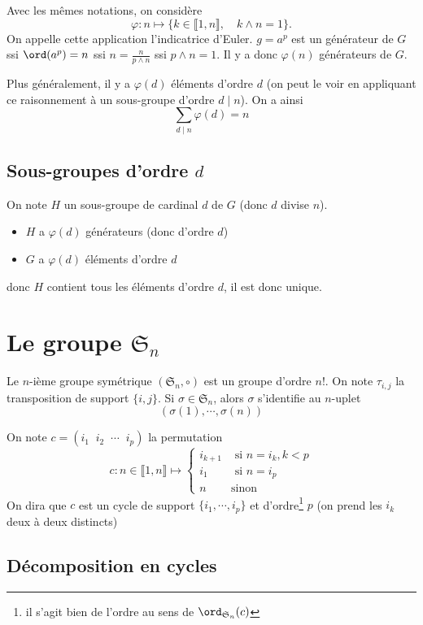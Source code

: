 Avec les mêmes notations, on considère \[
    \varphi: n\longmapsto \{k\in\llbracket 1, n\rrbracket, \quad k\land n=1\}.
\]
On appelle cette application l'indicatrice d'Euler.
$g=a^p$ est un générateur de $G$ ssi $\ord(a^p)=n$ ssi $n=\frac{n}{p\land n}$ ssi $p\land n=1$. Il y a donc $\varphi(n)$ générateurs de $G$.

Plus généralement, il y a $\varphi(d)$ éléments d'ordre $d$ (on peut le voir en appliquant ce raisonnement à un sous-groupe d'ordre $d\;|\; n$). On a ainsi \[
    \sum_{d\;|\; n}\varphi(d)=n
\]

\subsection{Sous-groupes d'ordre $d$}

On note $H$ un sous-groupe de cardinal $d$ de $G$ (donc $d$ divise $n$).
\begin{itemize}
    \item $H$ a $\varphi(d)$ générateurs (donc d'ordre $d$)
    \item $G$ a $\varphi(d)$ éléments d'ordre $d$
\end{itemize}
donc $H$ contient tous les éléments d'ordre $d$, il est donc unique.

\section{Le groupe \texorpdfstring{$\mathfrak S_n$}{symétrique d'ordre n}}

Le $n$-ième groupe symétrique $(\mathfrak S_n, \circ)$ est un groupe d'ordre $n!$. On note $\tau_{i, j}$ la transposition de support $\{i, j\}$. Si $\sigma \in \mathfrak S_n$, alors $\sigma$ s'identifie au $n$-uplet \[
    (\sigma(1), \cdots, \sigma(n))
\]

On note $c=(i_1\;\;i_2\;\;\cdots \;\;i_p)$ la permutation \[ 
    c: n \in\llbracket 1, n\rrbracket \longmapsto \begin{cases}
        i_{k+1}& \text{ si }n=i_k, k<p\\
        i_1 &\text{ si }n=i_p\\
        n & \text{sinon}
    \end{cases}
\] 
On dira que $c$ est un cycle de support $\{i_1, \cdots, i_p\}$ et d'ordre\footnote{il s'agit bien de l'ordre au sens de $\ord_{\mathfrak S_n}(c)$} $p$ (on prend les $i_k$ deux à deux distincts)

\subsection{Décomposition en cycles}

